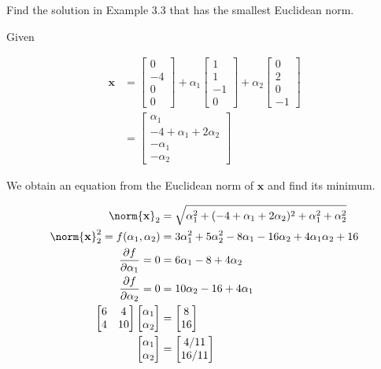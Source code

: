 \item[3.9] Find the solution in Example 3.3 that has the smallest Euclidean norm.

Given

\begin{align*}
 \mathbf{x} &= \begin{bmatrix} 0\\-4\\0\\0\end{bmatrix}
                + \alpha_1 \begin{bmatrix} 1\\1\\-1\\0\end{bmatrix}
                + \alpha_2\begin{bmatrix} 0\\2\\0\\-1\end{bmatrix}\\
&= \begin{bmatrix}
    \alpha_1\\
    -4 + \alpha_1 +2 \alpha_2\\
    -\alpha_1\\
    -\alpha_2
   \end{bmatrix}
\end{align*}

We obtain an equation from the Euclidean
norm of $\mathbf{x}$ and find its minimum.

\begin{align*}
\norm{\mathbf{x}}_2 &= \sqrt{\alpha_1^2 + (-4+\alpha_1 +2\alpha_2)^2 + \alpha_1^2 + \alpha_2^2}\\
\norm{\mathbf{x}}_2^2 = f(\alpha_1, \alpha_2 )&= 3 \alpha_1^2 + 5 \alpha_2^2 -8 \alpha_1 -16\alpha_2 +4 \alpha_1\alpha_2 +16\\
\frac{\partial f}{\partial \alpha_1} = 0 &= 6 \alpha_1 -8 + 4 \alpha_2\\
\frac{\partial f}{\partial \alpha_2} = 0 &= 10\alpha_2 -16 +4\alpha_1\\
\begin{bmatrix} 6&4\\4 & 10\end{bmatrix}
\begin{bmatrix}\alpha_1 \\ \alpha_2\end{bmatrix}
&= \begin{bmatrix} 8\\16 \end{bmatrix}\\
\begin{bmatrix}\alpha_1 \\ \alpha_2\end{bmatrix} &=
\begin{bmatrix}4/11 \\ 16/11 \end{bmatrix}
\end{align*}


